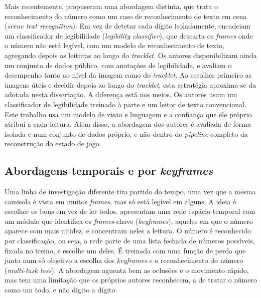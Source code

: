 Mais recentemente, \citet{koshkina2024general} propuseram uma abordagem distinta, que trata o reconhecimento do número como um caso de reconhecimento de texto em cena (\emph{scene text recognition}). Em vez de detetar cada dígito isoladamente, encadeiam um classificador de legibilidade (\emph{legibility classifier}), que descarta os \emph{frames} onde o número não está legível, com um modelo de reconhecimento de texto, agregando depois as leituras ao longo do \emph{tracklet}. Os autores disponibilizam ainda um conjunto de dados público, com anotações de legibilidade, e avaliam o desempenho tanto ao nível da imagem como do \emph{tracklet}. Ao escolher primeiro as imagens úteis e decidir depois ao longo do \emph{tracklet}, esta estratégia aproxima-se da adotada nesta dissertação. A diferença está nos meios. Os autores usam um classificador de legibilidade treinado à parte e um leitor de texto convencional. Este trabalho usa um modelo de visão e linguagem e a confiança que ele próprio atribui a cada leitura. Além disso, a abordagem dos autores é avaliada de forma isolada e num conjunto de dados próprio, e não dentro do \emph{pipeline} completo da reconstrução do estado de jogo.

\subsection{Abordagens temporais e por \emph{keyframes}}

Uma linha de investigação diferente tira partido do tempo, uma vez que a mesma camisola é vista em muitos \emph{frames}, mas só está legível em alguns. A ideia é escolher os bons em vez de ler todos. \citet{balaji2023jersey} apresentam uma rede espácio-temporal com um módulo que identifica os \emph{frames}-chave (\emph{keyframes}), aqueles em que o número aparece com mais nitidez, e concentram neles a leitura. O número é reconhecido por classificação, ou seja, a rede parte de uma lista fechada de números possíveis, fixada no treino, e escolhe um deles. É treinada com uma função de perda que junta num só objetivo a escolha dos \emph{keyframes} e o reconhecimento do número (\emph{multi-task loss}). A abordagem aguenta bem as oclusões e o movimento rápido, mas tem uma limitação que os próprios autores reconhecem, a de tratar o número como um todo, e não dígito a dígito.

